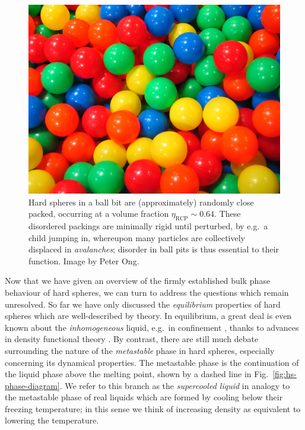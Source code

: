 \documentclass[11pt,twoside]{report}
\begin{document}
\begin{figure}
  \includegraphics[width=0.75\linewidth,outer]{ball-pit-horizontal}
  \caption[Random close packing in a ball pit]{
    Hard spheres in a ball bit are (approximately) randomly close packed, occurring at a volume fraction $\eta_\mathrm{RCP} \sim 0.64$.
    These disordered packings are minimally rigid until perturbed, by e.g.\ a child jumping in, whereupon many particles are collectively displaced in \emph{avalanches}; disorder in ball pits is thus essential to their function.
    Image by Peter Ong.}
  \label{fig:rcp}
\end{figure}

Now that we have given an overview of the firmly established bulk phase behaviour of hard spheres, we can turn to address the questions which remain unresolved.
So far we have only discussed the \emph{equilibrium} properties of hard spheres which are well-described by theory.
In equilibrium, a great deal is even known about the \emph{inhomogeneous} liquid, e.g.\ in confinement \cite{GonzalezJCP1998}, thanks to advances in density functional theory \cite{RosenfeldPRL1989,RothJPCM2010}.
By contrast, there are still much debate surrounding the nature of the \emph{metastable} phase in hard spheres, especially concerning its dynamical properties.
The metastable phase is the continuation of the liquid phase above the melting point, shown by a dashed line in Fig.\ \ref{fig:hs-phase-diagram}.
We refer to this branch as the \emph{supercooled liquid} in analogy to the metastable phase of real liquids which are formed by cooling below their freezing temperature; in this sense we think of increasing density as equivalent to lowering the temperature.
\end{document}
